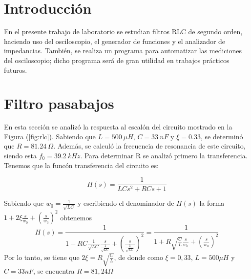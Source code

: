 







\tableofcontents
\newpage


\section{Introducción}
En el presente trabajo de laboratorio se estudian filtros RLC de segundo orden, haciendo uso del osciloscopio, el generador de funciones y el analizador de impedancias. También, se realiza un programa para automatizar las mediciones del osciloscopio; dicho programa será de gran utilidad en trabajos prácticos futuros.



\section{Filtro pasabajos}

En esta sección se analizó la respuesta al escalón del circuito mostrado en la Figura (\ref{fig:rlc}). Sabiendo que $L = 500 \ \mu H$, $C = 33 \ nF$ y $\xi = 0.33$, se determinó que $R = 81.24 \ \Omega$. Además, se calculó la frecuencia de resonancia de este circuito, siendo esta $f_0 = 39.2 \ kHz$. Para determinar R se analizó primero la transferencia. Tenemos que la funcón transferencia del circuito es:

\begin{equation}
	H(s) = \frac{1}{LC s^2 + RC s + 1}
	\label{equ:hrlc}
\end{equation}

Sabiendo que $w_0=\frac{1}{\sqrt{LC}}$ y escribiendo el denominador de $H(s)$ la forma $1+2\xi\frac{s}{w_0}+(\frac{s}{w_0})^2$ obtenemos \begin{equation}
    H(s)=\frac{1}{1+RC\frac{1}{\sqrt{LC}}\frac{s}{\frac{1}{\sqrt{LC}}}+(\frac{s}{\frac{1}{\sqrt{LC}}})^2}=\frac{1}{1+R\sqrt{\frac{C}{L}}\frac{s}{w_0}+(\frac{s}{w_0})^2}
\end{equation}
Por lo tanto, se tiene que $2\xi=R\sqrt{\frac{C}{L}}$, de donde como $\xi=0,33$, $L=500\mu H$ y $C=33nF$, se encuentra $R=81,24\Omega$


